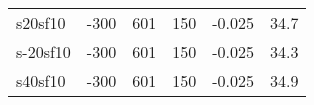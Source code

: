 \begin{tabular}{lrrrrr}
 s20sf10           &                                             -300 &                         601 &                   150 &                                           -0.025  &                            34.7 \\
 s-20sf10          &                                             -300 &                         601 &                   150 &                                           -0.025  &                            34.3 \\
 s40sf10           &                                             -300 &                         601 &                   150 &                                           -0.025  &                            34.9 \\
\hline
\end{tabular}
